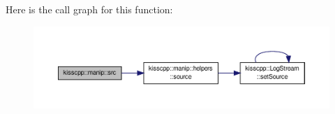 Here is the call graph for this function\-:\nopagebreak
\begin{figure}[H]
\begin{center}
\leavevmode
\includegraphics[width=350pt]{namespacekisscpp_1_1manip_a0660364105e23b9121ecf3d6d19858a5_cgraph}
\end{center}
\end{figure}


